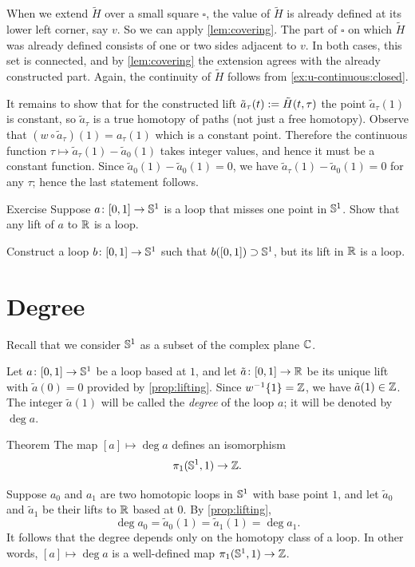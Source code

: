 When we extend $\tilde H$ over a small square $\square$, the value of $\tilde H$ is already defined at its lower left corner, say $v$.
So we can apply \ref{lem:covering}.
The part of $\square$ on which $\tilde H$ was already defined consists of one or two sides adjacent to $v$.
In both cases, this set is connected, and by \ref{lem:covering} the extension agrees with the already constructed part.
Again, the continuity of $\tilde H$ follows from \ref{ex:u-continuous:closed}.

It remains to show that for the constructed lift $\tilde a_\tau(t)\mathrel{:=} \tilde H(t,\tau)$ the point $\tilde a_\tau(1)$ is constant, so $\tilde a_\tau$ is a true homotopy of paths (not just a free homotopy).
Observe that $(w\circ \tilde a_\tau)(1)=a_\tau(1)$ which is a constant point.
Therefore the continuous function $\tau\mapsto \tilde a_\tau(1)-\tilde a_0(1)$ takes integer values, and hence it must be a constant function.
Since $\tilde a_0(1)-\tilde a_0(1)=0$, we have $\tilde a_\tau(1)-\tilde a_0(1)=0$ for any $\tau$; hence the last statement follows.
\qeds

\begin{thm}{Exercise}\label{ex:missed-point}
Suppose $a\colon[0,1]\to \mathbb{S}^1$ is a loop that misses one point in $\mathbb{S}^1$.
Show that any lift of $a$ to $\mathbb{R}$ is a loop.

Construct a loop $b\colon[0,1]\to \mathbb{S}^1$ such that $b([0,1])\supset \mathbb{S}^1$, but its lift in $\mathbb{R}$ is a loop.
\end{thm}


\section{Degree}

Recall that we consider $\mathbb{S}^1$ as a subset of the complex plane $\mathbb{C}$.

Let $a\colon[0,1]\to\mathbb{S}^1$ be a loop based at $1$, and let $\tilde a\colon[0,1]\to\mathbb{R}$ be its unique lift with $\tilde a(0)=0$ provided by \ref{prop:lifting}.
Since $w^{-1}\{1\}=\mathbb{Z}$, we have $\tilde a(1)\in\mathbb{Z}$.
The integer $\tilde a(1)$ will be called the \emph{degree} of the loop $a$; it will be denoted by $\deg a$.


\begin{thm}{Theorem}\label{thm:pi1S1Z}
The map $[a]\mapsto \deg a$ defines an isomorphism
\[\pi_1(\mathbb{S}^1,1)\to\mathbb{Z}.\]
\end{thm}

Suppose $a_0$ and $a_1$ are two homotopic loops in $\mathbb{S}^1$ with base point $1$,
and let $\tilde a_0$ and $\tilde a_1$ be their lifts to $\mathbb{R}$ based at $0$.
By \ref{prop:lifting},
\[\deg a_0=\tilde a_0(1)=\tilde a_1(1)=\deg a_1.\]
It follows that the degree depends only on the homotopy class of a loop.
In other words, $[a]\mapsto \deg a$ is a well-defined map $\pi_1(\mathbb{S}^1,1)\to \mathbb{Z}$.

